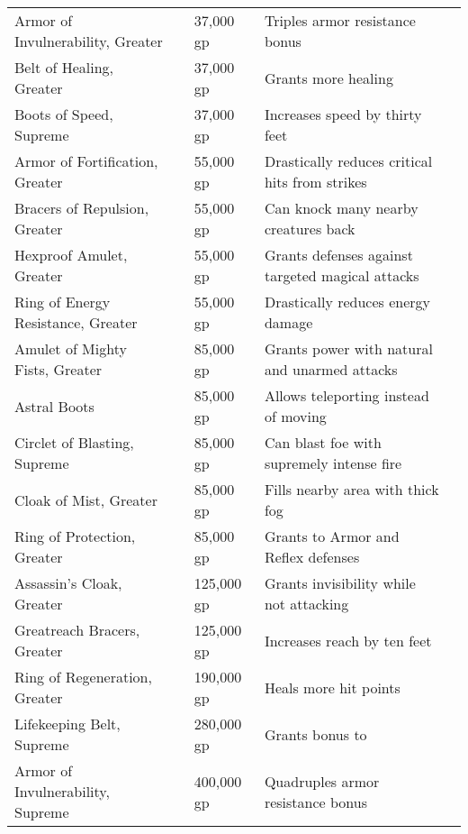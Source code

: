 \begin{longtabuwrapper}
\begin{longtabu}{l l l X l}
Armor of Invulnerability, Greater &  & 37,000 gp & Triples armor resistance bonus & \pageref{item:Armor of Invulnerability, Greater} \\
Belt of Healing, Greater &  & 37,000 gp & Grants more healing & \pageref{item:Belt of Healing, Greater} \\
Boots of Speed, Supreme &  & 37,000 gp & Increases speed by thirty feet & \pageref{item:Boots of Speed, Supreme} \\
Armor of Fortification, Greater &  & 55,000 gp & Drastically reduces critical hits from strikes & \pageref{item:Armor of Fortification, Greater} \\
Bracers of Repulsion, Greater &  & 55,000 gp & Can knock many nearby creatures back & \pageref{item:Bracers of Repulsion, Greater} \\
Hexproof Amulet, Greater &  & 55,000 gp & Grants  defenses against targeted magical attacks & \pageref{item:Hexproof Amulet, Greater} \\
Ring of Energy Resistance, Greater &  & 55,000 gp & Drastically reduces energy damage & \pageref{item:Ring of Energy Resistance, Greater} \\
Amulet of Mighty Fists, Greater &  & 85,000 gp & Grants  power with natural and unarmed attacks & \pageref{item:Amulet of Mighty Fists, Greater} \\
Astral Boots &  & 85,000 gp & Allows teleporting instead of moving & \pageref{item:Astral Boots} \\
Circlet of Blasting, Supreme &  & 85,000 gp & Can blast foe with supremely intense fire & \pageref{item:Circlet of Blasting, Supreme} \\
Cloak of Mist, Greater &  & 85,000 gp & Fills nearby area with thick fog & \pageref{item:Cloak of Mist, Greater} \\
Ring of Protection, Greater &  & 85,000 gp & Grants  to Armor and Reflex defenses & \pageref{item:Ring of Protection, Greater} \\
Assassin's Cloak, Greater &  & 125,000 gp & Grants invisibility while not attacking & \pageref{item:Assassin's Cloak, Greater} \\
Greatreach Bracers, Greater &  & 125,000 gp & Increases reach by ten feet & \pageref{item:Greatreach Bracers, Greater} \\
Ring of Regeneration, Greater &  & 190,000 gp & Heals more hit points & \pageref{item:Ring of Regeneration, Greater} \\
Lifekeeping Belt, Supreme &  & 280,000 gp & Grants  bonus to  & \pageref{item:Lifekeeping Belt, Supreme} \\
Armor of Invulnerability, Supreme &  & 400,000 gp & Quadruples armor resistance bonus & \pageref{item:Armor of Invulnerability, Supreme} \\
\end{longtabu}
\end{longtabuwrapper}
